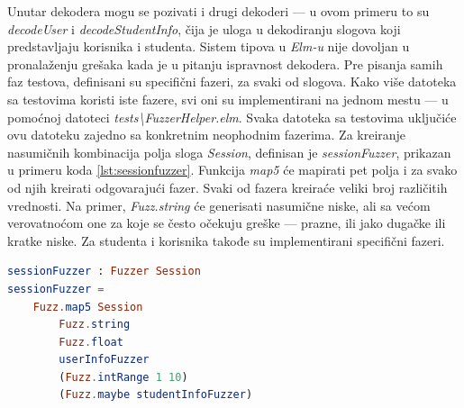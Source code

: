 \documentclass[12pt,oneside]{memoir}
\begin{document}
\par Unutar dekodera mogu se pozivati i drugi dekoderi --- u ovom primeru to su \emph{decodeUser} i \emph{decodeStudentInfo}, čija je uloga u dekodiranju slogova koji predstavljaju korisnika i studenta. Sistem tipova u \emph{Elm-u} nije dovoljan u pronalaženju grešaka kada je u pitanju ispravnost dekodera. Pre pisanja samih faz testova, definisani su specifični fazeri, za svaki od slogova. Kako više datoteka sa testovima koristi iste fazere, svi oni su implementirani na jednom mestu --- u pomoćnoj datoteci \emph{tests{\textbackslash}FuzzerHelper.elm}. Svaka datoteka sa testovima uključiće ovu datoteku zajedno sa konkretnim neophodnim fazerima. Za kreiranje nasumičnih kombinacija polja sloga \emph{Session}, definisan je \emph{sessionFuzzer}, prikazan u primeru koda \ref{lst:sessionfuzzer}. Funkcija \emph{map5} će mapirati pet polja i za svako od njih kreirati odgovarajući fazer. Svaki od fazera kreiraće veliki broj različitih vrednosti. Na primer, \emph{Fuzz.string} će generisati nasumične niske, ali sa većom verovatnoćom one za koje se često očekuju greške --- prazne, ili jako dugačke ili kratke niske. Za studenta i korisnika takođe su implementirani specifični fazeri.

\begin{minipage}{\linewidth}
\begin{lstlisting}[language=elm, basicstyle=\small, caption={Implementacija fazera za slog \emph{Session}},captionpos=b, label={lst:sessionfuzzer}]
sessionFuzzer : Fuzzer Session
sessionFuzzer = 
    Fuzz.map5 Session
        Fuzz.string
        Fuzz.float
        userInfoFuzzer
        (Fuzz.intRange 1 10)
        (Fuzz.maybe studentInfoFuzzer)
\end{lstlisting} 
\end{minipage}
\end{document}
